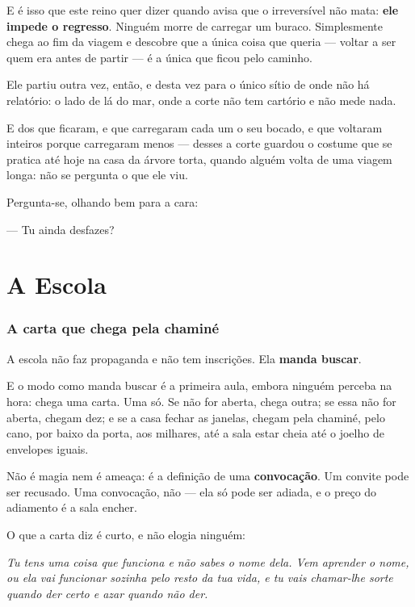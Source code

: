 \documentclass[livro.tex]{subfiles}
\begin{document}
E é isso que este reino quer dizer quando avisa que o irreversível não mata: \textbf{ele
impede o regresso}. Ninguém morre de carregar um buraco. Simplesmente chega ao fim da
viagem e descobre que a única coisa que queria --- voltar a ser quem era antes de partir
--- é a única que ficou pelo caminho.

\medskip

Ele partiu outra vez, então, e desta vez para o único sítio de onde não há relatório: o
lado de lá do mar, onde a corte não tem cartório e não mede nada.

E dos que ficaram, e que carregaram cada um o seu bocado, e que voltaram inteiros porque
carregaram menos --- desses a corte guardou o costume que se pratica até hoje na casa da
árvore torta, quando alguém volta de uma viagem longa: não se pergunta o que ele viu.

Pergunta-se, olhando bem para a cara:

--- Tu ainda desfazes?



\part{A Escola}

\section{A carta que chega pela chaminé}

A escola não faz propaganda e não tem inscrições. Ela \textbf{manda buscar}.

E o modo como manda buscar é a primeira aula, embora ninguém perceba na hora: chega uma
carta. Uma só. Se não for aberta, chega outra; se essa não for aberta, chegam dez; e se a
casa fechar as janelas, chegam pela chaminé, pelo cano, por baixo da porta, aos milhares,
até a sala estar cheia até o joelho de envelopes iguais.

Não é magia nem é ameaça: é a definição de uma \textbf{convocação}. Um convite pode ser
recusado. Uma convocação, não --- ela só pode ser adiada, e o preço do adiamento é a sala
encher.

\medskip

O que a carta diz é curto, e não elogia ninguém:

\emph{Tu tens uma coisa que funciona e não sabes o nome dela. Vem aprender o nome, ou
ela vai funcionar sozinha pelo resto da tua vida, e tu vais chamar-lhe sorte quando der
certo e azar quando não der.}
\end{document}
